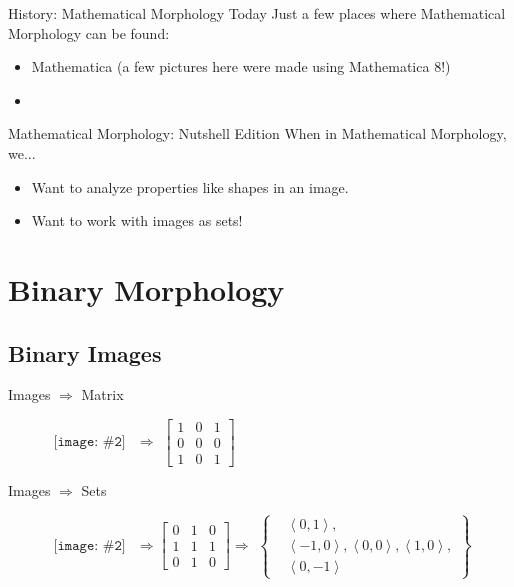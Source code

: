 \documentclass{beamer}
\newcommand{\pic}[2]{
     \begin{array}{l}
      \texttt{[image: \#2]}
      \end{array}
}
\newcommand{\set}[1]{\left\lbrace #1 \right\rbrace}
\newcommand{\tuple}[1]{\left\langle #1 \right\rangle}
\begin{document}
\begin{frame}{History: Mathematical Morphology Today}
  Just a few places where Mathematical Morphology can be found:
  \begin{itemize}
     \item Mathematica (a few pictures here were made using Mathematica 8!)
     \item 
  \end{itemize}
\end{frame}

\begin{frame}{Mathematical Morphology: Nutshell Edition}
  When in Mathematical Morphology, we...
  \begin{itemize}
    \item Want to analyze properties like shapes in an image.
    \item Want to work with images as sets!
  \end{itemize} 
\end{frame}

\section{Binary Morphology}

\subsection{Binary Images}
\begin{frame}{Images $\Rightarrow$ Matrix}
\begin{figure}
\centering
$\pic{width=50pt}{images/cross.png}$
$\Rightarrow$
$\begin{bmatrix}
  1 & 0 & 1\\
  0 & 0 & 0\\
  1 & 0 & 1
\end{bmatrix}$
\end{figure}
\end{frame}

\begin{frame}{Images $\Rightarrow$ Sets}
\begin{figure}
\centering
$\pic{width=50pt}{images/cross.png}  $
$\Rightarrow
\begin{bmatrix}
  0 & 1 & 0\\
  1 & 1 & 1\\
  0 & 1 & 0
\end{bmatrix}
\Rightarrow$
$\set{\begin{aligned}
      &\tuple{0,1},\\
      &\tuple{-1,0},\tuple{0,0},\tuple{1,0},\\
      &\tuple{0,-1}
      \end{aligned}}$
\end{figure}
\end{frame}
\end{document}
